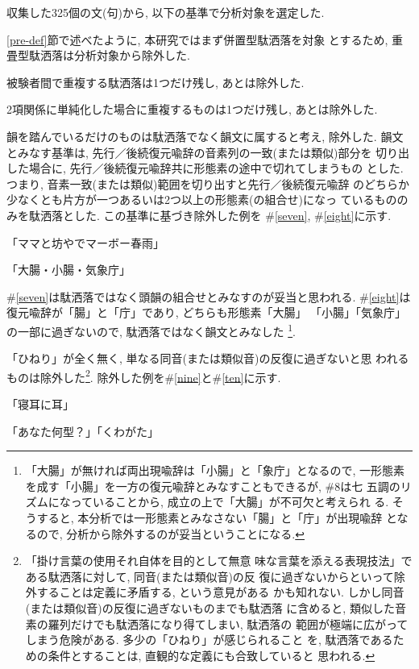 収集した325個の文(句)から, 以下の基準で分析対象を選定した. \\

\begin{enumerate}
{\def\labelenumi{}
\item \ref{pre-def}節で述べたように, 本研究ではまず併置型駄洒落を対象
とするため, 重畳型駄洒落は分析対象から除外した.  
\item 被験者間で重複する駄洒落は1つだけ残し, あとは除外した. 
\item 2項関係に単純化した場合に重複するものは1つだけ残し, あとは除外した. 
\item 韻を踏んでいるだけのものは駄洒落でなく韻文に属すると考え, 除外した. 
韻文とみなす基準は, 先行／後続復元喩辞の音素列の一致(または類似)部分を
切り出した場合に, 先行／後続復元喩辞共に形態素の途中で切れてしまうもの
とした. つまり, 音素一致(または類似)範囲を切り出すと先行／後続復元喩辞
のどちらか少なくとも片方が一つあるいは2つ以上の形態素(の組合せ)になっ
ているもののみを駄洒落とした. この基準に基づき除外した例を
\#\ref{seven}, \#\ref{eight}に示す.   

\vspace*{1em}\begin{sample}
\item 「ママと坊やでマーボー春雨」\label{seven}
\item 「大腸・小腸・気象庁」\label{eight}
\end{sample}\vspace*{1em}
\#\ref{seven}は駄洒落ではなく頭韻の組合せとみなすのが妥当と思われる.
\#\ref{eight}は復元喩辞が「腸」と「庁」であり, どちらも形態素「大腸」
「小腸」「気象庁」の一部に過ぎないので, 駄洒落ではなく韻文とみなした
\footnote{「大腸」が無ければ両出現喩辞は「小腸」と「象庁」となるので, 
一形態素を成す「小腸」を一方の復元喩辞とみなすこともできるが, \#8は七
五調のリズムになっていることから, 成立の上で「大腸」が不可欠と考えられ
る. そうすると, 本分析では一形態素とみなさない「腸」と「庁」が出現喩辞
となるので, 分析から除外するのが妥当ということになる. }.    

\item 「ひねり」が全く無く, 単なる同音(または類似音)の反復に過ぎないと思
われるものは除外した\footnote{「掛け言葉の使用それ自体を目的として無意
味な言葉を添える表現技法」である駄洒落に対して, 同音(または類似音)の反
復に過ぎないからといって除外することは定義に矛盾する, という意見がある
かも知れない. しかし同音(または類似音)の反復に過ぎないものまでも駄洒落
に含めると, 類似した音素の羅列だけでも駄洒落になり得てしまい, 駄洒落の
範囲が極端に広がってしまう危険がある. 多少の「ひねり」が感じられること
を, 駄洒落であるための条件とすることは, 直観的な定義にも合致していると
思われる. }. 除外した例を\#\ref{nine}と\#\ref{ten}に示す. 

\vspace*{1em}\begin{sample}
\item 「寝耳に耳」\label{nine}
\item 「あなた何型？」「くわがた」\label{ten}
\end{sample}\vspace*{1em}
}
\end{enumerate}

